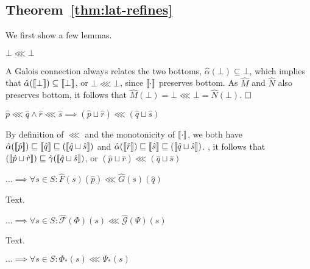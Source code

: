 
\subsection{Theorem~\ref{thm:lat-refines}}

We first show a few lemmas.

\begin{lemma} \label{lem:bot-refine-bot}
$\bot \lll \bot$
\end{lemma}

A Galois connection always relates the two bottoms, $\hat \alpha(\bot) \subseteq \bot$, which implies that $\hat \alpha(\llbracket \bot \rrbracket) \subseteq \llbracket \bot \rrbracket$, or $\bot \lll \bot$, since $\llbracket \cdot \rrbracket$ preserves bottom. As $\hat M$ and $\hat N$ also preserves bottom, it follows that $\hat M(\bot) = \bot \lll \bot = \hat N(\bot)$. $\qedbox$

\begin{lemma} \label{lem:closed-join}
$\hat p \lll \hat q \wedge \hat r \lll \hat s \implies (\hat p \sqcup \hat r) \lll (\hat q \sqcup \hat s)$
\end{lemma}

By definition of $\lll$ and the monotonicity of $\llbracket \cdot \rrbracket$, we both have $\hat \alpha(\llbracket \hat p \rrbracket) \sqsubseteq \llbracket \hat q \rrbracket \sqsubseteq (\llbracket \hat q \sqcup \hat s \rrbracket)$ and $\hat \alpha(\llbracket \hat r \rrbracket) \sqsubseteq \llbracket \hat s \rrbracket \sqsubseteq (\llbracket \hat q \sqcup \hat s \rrbracket)$. , it follows that $(\llbracket \hat p \sqcup \hat r \rrbracket) \sqsubseteq \hat \gamma(\llbracket \hat q \sqcup \hat s \rrbracket)$, or $(\hat p \sqcup \hat r) \lll (\hat q \sqcup \hat s)$

\begin{lemma} \label{lem:1}
$\dots \implies \forall s \in S : \hat{F}(s)(\hat p) \lll \hat{G}(s)(\hat q)$
\end{lemma}

Text.

\begin{lemma} \label{lem:2}
$\dots \implies \forall s \in S : \hat{\mathcal{F}}(\Phi)(s) \lll \hat{\mathcal{G}}(\Psi)(s)$
\end{lemma}

Text.

\begin{lemma} \label{lem:3}
$\dots \implies \forall s \in S : \Phi_{*}(s) \lll \Psi_{*}(s)$
\end{lemma}

